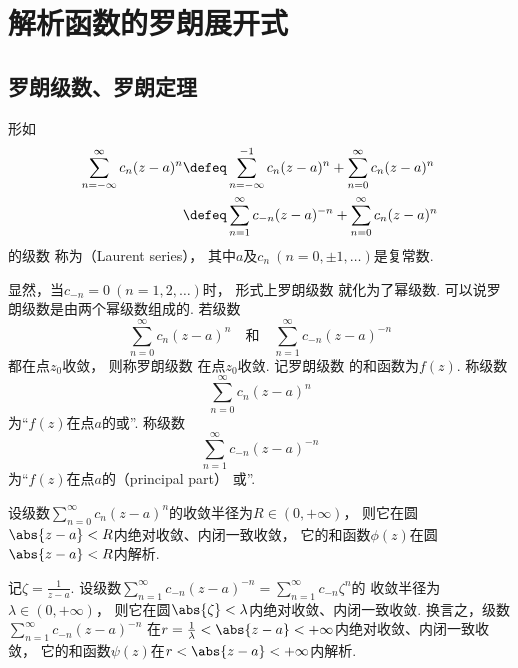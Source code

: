 \section{解析函数的罗朗展开式}
\subsection{罗朗级数、罗朗定理}
\begin{definition}
形如\begin{equation}\label{equation:解析函数的级数表示.罗朗级数}
\begin{split}
	\sum_{n=-\infty}^\infty c_n (z-a)^n
	&\defeq \sum_{n=-\infty}^{-1} c_n (z-a)^n + \sum_{n=0}^\infty c_n (z-a)^n \\
	&\defeq \sum_{n=1}^\infty c_{-n} (z-a)^{-n} + \sum_{n=0}^\infty c_n (z-a)^n
\end{split}
\end{equation}的级数
称为（Laurent series），
其中\(a\)及\(c_n\ (n=0,\pm1,\dotsc)\)是复常数.
\end{definition}
显然，当\(c_{-n}=0\ (n=1,2,\dotsc)\)时，
形式上罗朗级数  就化为了幂级数.
可以说罗朗级数是由两个幂级数组成的.
若级数\[
	\sum_{n=0}^\infty c_n (z-a)^n
	\quad\text{和}\quad
	\sum_{n=1}^\infty c_{-n} (z-a)^{-n}
\]都在点\(z_0\)收敛，
则称罗朗级数  在点\(z_0\)收敛.
记罗朗级数  的和函数为\(f(z)\).
称级数\[
	\sum_{n=0}^\infty c_n (z-a)^n
\]为“\(f(z)\)在点\(a\)的或”.
称级数\[
	\sum_{n=1}^\infty c_{-n} (z-a)^{-n}
\]为“\(f(z)\)在点\(a\)的（principal part）
或”.

设级数\(\sum_{n=0}^\infty c_n (z-a)^n\)的收敛半径为\(R \in (0,+\infty)\)，
则它在圆\(\abs{z-a}<R\)内绝对收敛、内闭一致收敛，
它的和函数\(\phi(z)\)在圆\(\abs{z-a}<R\)内解析.

记\(\zeta = \frac{1}{z-a}\).
设级数\(\sum_{n=1}^\infty c_{-n} (z-a)^{-n} = \sum_{n=1}^\infty c_{-n} \zeta^n\)的
收敛半径为\(\lambda \in (0,+\infty)\)，
则它在圆\(\abs{\zeta} < \lambda\)内绝对收敛、内闭一致收敛.
换言之，级数\(\sum_{n=1}^\infty c_{-n} (z-a)^{-n}\)
在\(r = \frac{1}{\lambda} < \abs{z-a} < +\infty\)内绝对收敛、内闭一致收敛，
它的和函数\(\psi(z)\)在\(r < \abs{z-a} < +\infty\)内解析.


